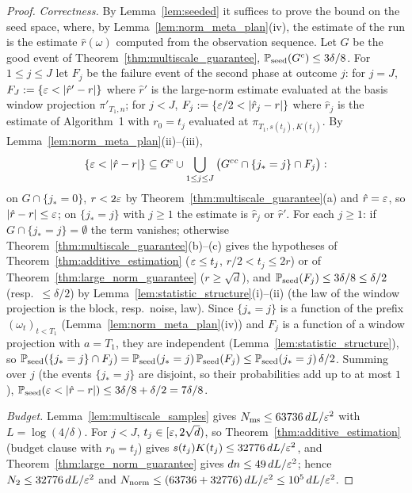 \begin{proof}
\leanok
{}
\emph{Correctness.} By Lemma~\ref{lem:seeded} it suffices to prove the bound on the seed
space, where, by Lemma~\ref{lem:norm_meta_plan}(iv), the estimate of the run is the
estimate $\hat r(\omega)$ computed from the observation sequence. Let $G$ be the good event
of Theorem~\ref{thm:multiscale_guarantee}, $\mathbb{P}_{\mathrm{seed}}(G^c) \le 3\delta/8$. For
$1 \le j \le J$ let $F_j$ be the failure event of the second phase at outcome $j$: for
$j = J$, $F_J := \{ \varepsilon < |\hat r' - r| \}$ where $\hat r'$ is the large-norm estimate
evaluated at the basis window projection $\pi'_{T_1,n}$; for $j < J$,
$F_j := \{ \varepsilon/2 < |\hat r_j - r| \}$ where $\hat r_j$ is the estimate of Algorithm~1 with
$r_0 = t_j$ evaluated at $\pi_{T_1, s(t_j), K(t_j)}$. By Lemma~\ref{lem:norm_meta_plan}(ii)--(iii),
\[
  \{ \varepsilon < |\hat r - r| \} \subseteq G^c \cup \bigcup_{1 \le j \le J}
    \big( G^c{}^c \cap \{j_* = j\} \cap F_j \big):
\]
on $G \cap \{j_* = 0\}$, $r < 2\varepsilon$ by Theorem~\ref{thm:multiscale_guarantee}(a) and
$\hat r = \varepsilon$, so $|\hat r - r| \le \varepsilon$; on $\{j_* = j\}$ with $j \ge 1$ the estimate is
$\hat r_j$ or $\hat r'$. For each $j \ge 1$: if $G \cap \{j_* = j\} = \emptyset$ the term
vanishes; otherwise Theorem~\ref{thm:multiscale_guarantee}(b)--(c) gives the hypotheses of
Theorem~\ref{thm:additive_estimation} ($\varepsilon \le t_j$, $r/2 < t_j \le 2r$) or of
Theorem~\ref{thm:large_norm_guarantee} ($r \ge \sqrt d$), and
$\mathbb{P}_{\mathrm{seed}}(F_j) \le 3\delta/8 \le \delta/2$ (resp.\ $\le \delta/2$) by
Lemma~\ref{lem:statistic_structure}(i)--(ii) (the law of the window projection is the
block, resp.\ noise, law). Since $\{j_* = j\}$ is a function of the prefix
$(\omega_t)_{t<T_1}$ (Lemma~\ref{lem:norm_meta_plan}(iv)) and $F_j$ is a function of a window
projection with $a = T_1$, they are independent (Lemma~\ref{lem:statistic_structure}), so
$\mathbb{P}_{\mathrm{seed}}(\{j_* = j\} \cap F_j) = \mathbb{P}_{\mathrm{seed}}(j_* = j)\,\mathbb{P}_{\mathrm{seed}}(F_j)
\le \mathbb{P}_{\mathrm{seed}}(j_* = j)\,\delta/2$. Summing over $j$ (the events $\{j_* = j\}$ are
disjoint, so their probabilities add up to at most $1$),
$\mathbb{P}_{\mathrm{seed}}(\varepsilon < |\hat r - r|) \le 3\delta/8 + \delta/2 = 7\delta/8$.

\emph{Budget.} Lemma~\ref{lem:multiscale_samples} gives $N_{\mathrm{ms}} \le 63736\,dL/\varepsilon^2$
with $L = \log(4/\delta)$. For $j < J$, $t_j \in [\varepsilon, 2\sqrt d)$, so
Theorem~\ref{thm:additive_estimation} (budget clause with $r_0 = t_j$) gives
$s(t_j)K(t_j) \le 32776\,dL/\varepsilon^2$, and Theorem~\ref{thm:large_norm_guarantee} gives
$dn \le 49\,dL/\varepsilon^2$; hence $N_2 \le 32776\,dL/\varepsilon^2$ and
$N_{\mathrm{norm}} \le (63736 + 32776)\,dL/\varepsilon^2 \le 10^5\,dL/\varepsilon^2$.
\end{proof}

